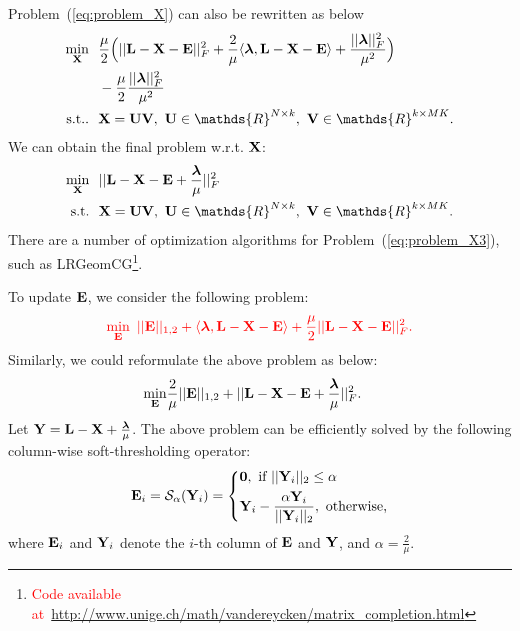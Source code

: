 \documentclass[letterpaper]{article}
\def\bE{{\bf E}}
\def\blambda{{\bm \lambda}}
\def\calS{{\mathcal{S}}}
\def\bL{{\bf L}}
\def\bU{{\bf U}}
\def\bV{{\bf V}}
\def\dsR{\mathds{R}}
\def\bX{{\bf X}}
\def\bX{{\bf X}}
\def\bY{{\bf Y}}
\def\zerocolumn{{\bf 0}}
\def\st{{\text{s.t.}}}
\def\yanred{\textcolor{red}}
\begin{document}
Problem~(\ref{eq:problem_X}) can also be rewritten as below
\begin{align}\label{eq:problem_X2}
  \min_{\bX} ~&~ \frac{\mu}{2} \Big( || \bL - \bX - \bE ||_F^2 + \frac{2}{\mu} \langle \blambda, \bL - \bX - \bE \rangle + \frac{|| \blambda ||_F^2}{\mu^2} \Big)    \nonumber   \\
             ~&~ - \frac{\mu}{2} \frac{|| \blambda ||_F^2}{\mu^2}   \nonumber \\
  \st.       ~&~ \bX = \bU \bV,~\bU \in \dsR^{N \times k},~\bV \in \dsR^{k \times MK}   .
\end{align}
\noindent
We can obtain the final problem w.r.t. $\bX$:
\begin{align}\label{eq:problem_X3}
  \min_{\bX} ~&~ || \bL - \bX - \bE + \frac{\blambda}{\mu} ||_F^2   \nonumber \\
  \st        ~&~ \bX = \bU \bV,~\bU \in \dsR^{N \times k},~\bV \in \dsR^{k \times MK}   .
\end{align}
\noindent
There are a number of optimization algorithms for Problem~(\ref{eq:problem_X3}), such as LRGeomCG\footnote{\yanred{Code available at~\url{http://www.unige.ch/math/vandereycken/matrix_completion.html}}}.




To update $\bE$, we consider the following problem:
\begin{align}\label{eq:problem_E}
  \yanred{
  \min_{\bE} ~ || \bE ||_{1,2} + \langle \blambda, \bL - \bX - \bE \rangle + \frac{\mu}{2} || \bL - \bX - \bE ||_F^2   .
  }
\end{align}
\noindent
Similarly, we could reformulate the above problem as below:
\begin{align}\label{eq:problem_E2}
  \min_{\bE} & \frac{2}{\mu} || \bE ||_{1,2} + || \bL - \bX - \bE + \frac{\blambda}{\mu} ||_F^2    .
\end{align}
\noindent
Let $\bY = \bL - \bX + \frac{\blambda}{\mu}$.
The above problem can be efficiently solved by the following column-wise soft-thresholding operator:
\begin{align}\label{eq:column_wise_soft_thresholding}
  \bE_{i} = \calS_{\alpha}(\bY_{i}) = \left\{
    \begin{aligned}
      & \zerocolumn,~\text{if}~ ||\bY_{i}||_2 \leq \alpha   \\
      & \bY_{i} - \frac{\alpha \bY_{i}}{|| \bY_{i} ||_2},~\text{otherwise,}
    \end{aligned}
    \right.
\end{align}
\noindent
where $\bE_{i}$ and $\bY_{i}$ denote the $i$-th column of $\bE$ and $\bY$,
and $\alpha = \frac{2}{\mu}$.
\end{document}
